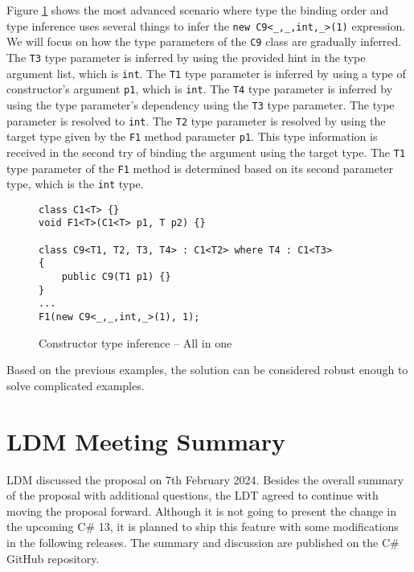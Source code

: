 \newpage

\par
Figure \ref{img79:example7} shows the most advanced scenario where type the binding order and type inference uses several things to infer the \texttt{new C9<\_,\_,int,\_>(1)} expression. 
We will focus on how the type parameters of the \texttt{C9} class are gradually inferred. 
The \texttt{T3} type parameter is inferred by using the provided hint in the type argument list, which is \texttt{int}. 
The \texttt{T1} type parameter is inferred by using a type of constructor’s argument \texttt{p1}, which is \texttt{int}.
The \texttt{T4} type parameter is inferred by using the type parameter’s dependency using the \texttt{T3} type parameter. 
The type parameter is resolved to \texttt{int}. 
The \texttt{T2} type parameter is resolved by using the target type given by the \texttt{F1} method parameter \texttt{p1}. 
This type information is received in the second try of binding the argument using the target type. 
The \texttt{T1} type parameter of the \texttt{F1} method is determined based on its second parameter type, which is the \texttt{int} type.
\begin{figure}[!h]
\begin{lstlisting}[style=csharp, showstringspaces=false]
class C1<T> {}
void F1<T>(C1<T> p1, T p2) {}

class C9<T1, T2, T3, T4> : C1<T2> where T4 : C1<T3>
{
    public C9(T1 p1) {}
}
...
F1(new C9<_,_,int,_>(1), 1);
\end{lstlisting}
\caption{Constructor type inference -- All in one}
\label{img79:example7}
\end{figure}
\par
Based on the previous examples, the solution can be considered robust enough to solve complicated examples.

\newpage

\section{LDM Meeting Summary}

\ac{LDM} discussed the proposal on 7th February 2024. 
Besides the overall summary of the proposal with additional questions, the \ac{LDT} agreed to continue with moving the proposal forward. 
Although it is not going to present the change in the upcoming C\# 13, it is planned to ship this feature with some modifications in the following releases. 
The summary \cite{online:mettingSummary} and discussion \cite{online:mettingSummaryDisc} are published on the C\# GitHub repository.